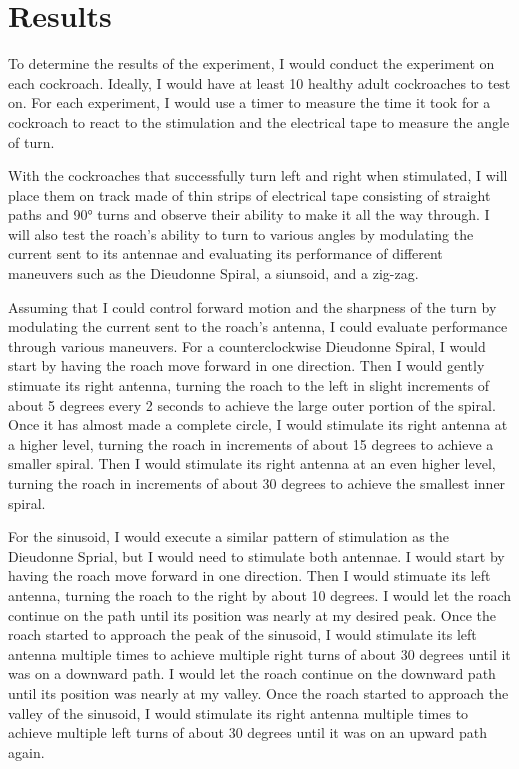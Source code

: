 \section{Results}


To determine the results of the experiment, I would conduct the experiment on each cockroach. Ideally, I would have at least 10 healthy adult cockroaches to test on. For each experiment, I would use a timer to measure the time it took for a cockroach to react to the stimulation and the electrical tape to measure the angle of turn. 


With the cockroaches that successfully turn left and right when stimulated, I will place them on track made of thin strips of electrical tape consisting of straight paths and \ang{90} turns and observe their ability to make it all the way through. I will also test the roach's ability to turn to various angles by modulating the current sent to its antennae and evaluating its performance of different maneuvers such as the Dieudonne Spiral, a siunsoid, and a zig-zag.

Assuming that I could control forward motion and the sharpness of the turn by modulating the current sent to the roach's antenna, I could evaluate performance through various maneuvers. For a counterclockwise Dieudonne Spiral, I would start by having the roach move forward in one direction. Then I would gently stimuate its right antenna, turning the roach to the left in slight increments of about 5 degrees every 2 seconds to achieve the large outer portion of the spiral. Once it has almost made a complete circle, I would stimulate its right antenna at a higher level, turning the roach in increments of about 15 degrees to achieve a smaller spiral. Then I would stimulate its right antenna at an even higher level, turning the roach in increments of about 30 degrees to achieve the smallest inner spiral.

For the sinusoid, I would execute a similar pattern of stimulation as the Dieudonne Sprial, but I would need to stimulate both antennae. I would start by having the roach move forward in one direction. Then I would stimuate its left antenna, turning the roach to the right by about 10 degrees. I would let the roach continue on the path until its position was nearly at my desired peak. Once the roach started to approach the peak of the sinusoid, I would stimulate its left antenna multiple times to achieve multiple right turns of about 30 degrees until it was on a downward path. I would let the roach continue on the downward path until its position was nearly at my valley. Once the roach started to approach the valley of the sinusoid, I would stimulate its right antenna multiple times to achieve multiple left turns of about 30 degrees until it was on an upward path again.

